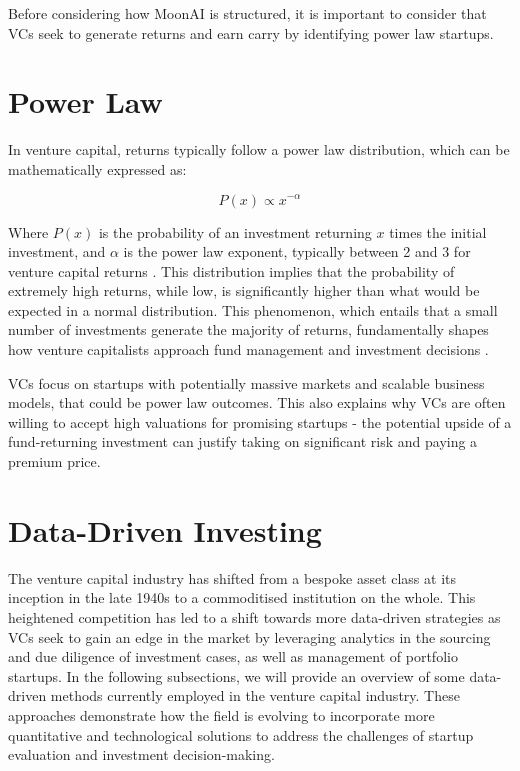 \documentclass[a4paper, oneside]{discothesis}
\begin{document}
Before considering how MoonAI is structured, it is important to consider that VCs seek to generate returns and earn carry by identifying power law startups. 

\section{Power Law}

In venture capital, returns typically follow a power law distribution, which can be mathematically expressed as:

\begin{equation}
P(x) \propto x^{-\alpha}
\end{equation}

Where $P(x)$ is the probability of an investment returning $x$ times the initial investment, and $\alpha$ is the power law exponent, typically between 2 and 3 for venture capital returns \cite{clauset2009power}. This distribution implies that the probability of extremely high returns, while low, is significantly higher than what would be expected in a normal distribution. This phenomenon, which entails that a small number of investments generate the majority of returns, fundamentally shapes how venture capitalists approach fund management and investment decisions \cite{peter2015power}.

VCs focus on startups with potentially massive markets and scalable business models, that could be power law outcomes. This also explains why VCs are often willing to accept high valuations for promising startups - the potential upside of a fund-returning investment can justify taking on significant risk and paying a premium price.

\section{Data-Driven Investing}
The venture capital industry has shifted from a bespoke asset class at its inception in the late 1940s to a commoditised institution on the whole. This heightened competition has led to a shift towards more data-driven strategies as VCs seek to gain an edge in the market by leveraging analytics in the sourcing and due diligence of investment cases, as well as management of portfolio startups. In the following subsections, we will provide an overview of some data-driven methods currently employed in the venture capital industry. These approaches demonstrate how the field is evolving to incorporate more quantitative and technological solutions to address the challenges of startup evaluation and investment decision-making.
\end{document}
